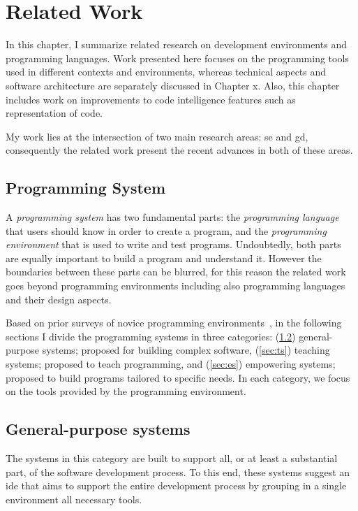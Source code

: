 \chapter{Related Work}
\label{chapter:relatedWork}

In this chapter, I summarize related research on development environments and programming languages. Work presented here focuses on the programming tools used in different contexts and environments, whereas technical aspects and software architecture are separately discussed in Chapter x. Also, this chapter includes work on improvements to code intelligence features such as representation of code.

My work lies at the intersection of two main research areas: \gls{se} and \gls{gd}, consequently the related work present the recent advances in both of these areas.

\section{Programming System}
\label{sec:ps}
A \textit{programming system} has two fundamental parts: the \textit{programming language} that users should know in order to create a program, and the \textit{programming environment} that is used to write and test programs. Undoubtedly, both parts are equally important to build a program and understand it. However the boundaries between these parts can be blurred, for this reason the related work goes beyond programming environments including also programming languages and their design aspects. 

Based on prior surveys of novice programming environments~\citep{kelleher2005lowering}, in the following sections I divide the programming systems in three categories: (\ref{sec:gs}) general-purpose systems; proposed for building complex software, (\ref{sec:ts}) teaching systems; proposed to teach programming, and (\ref{sec:es}) empowering systems; proposed to build programs tailored to specific needs. In each category, we focus on the tools provided by the programming environment.
\section{General-purpose systems}
\label{sec:gs}

The systems in this category are built to support all, or at least a substantial part, of the software development process. To this end, these systems suggest an \gls{ide} that aims to support the entire development process by grouping in a single environment all necessary tools.

